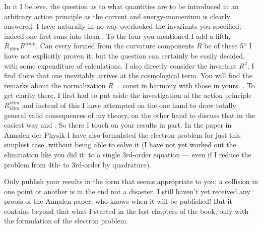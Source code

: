 \begin{letter}{1}
In it I believe, the question as to what quantities are to be introduced in an arbitrary action principle as the current and energy-momentum is clearly answered. I have naturally in no way overlooked the invariants you specified; indeed one first runs into them . To the four you mentioned I add a fifth, $R_{iklm}R^{ilmk}$. Can every  formed from the curvature components $R$ be  of these 5? I have not explicitly proven it; but the question can certainly be easily decided, with some expenditure of calculations.  I also directly consider the invariant $R^2$; I find there that one inevitably arrives at the cosmological term. You will find the remarks about the normalization $R=\text{const}$ in harmony with those in yours. . To get clarity there, I first had to put aside the investigation of the action principle $R_{iklm}^{iklm}$ and instead of this I have attempted on the one hand to draw totally general valid consequences of my theory, on the other hand to discuss that in the easiest way and . So there I touch on your results in part. In the paper in Annalen der Physik I have also formulated the electron problem for just this simplest case, without being able to solve it (I have not yet worked out the elimination like you did it: to a single 3rd-order equation — even if I reduce the problem from 4th- to 3rd-order by quadrature).

Only publish your results in the form that seems appropriate to you; a collision in one point or another is in the end not a disaster. I still haven't yet received any proofs of the Annalen paper; who knows when it will be published! But it contains beyond that what I started in the last chapters of the book, only with the formulation of the electron problem.


\end{letter}
